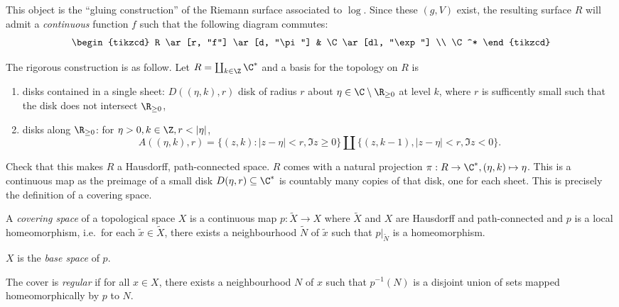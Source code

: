\documentclass[a4paper]{article}
\begin{document}
\begin{eg}
  This object is the ``gluing construction'' of the Riemann surface associated to \(\log\). Since these \((g, V)\) exist, the resulting surface \(R\) will admit a \emph{continuous} function \(f\) such that the following diagram commutes:
  \[
    \begin{tikzcd}
      R \ar[r, "f"] \ar[d, "\pi"] & \C \ar[dl, "\exp"] \\
      \C^*
    \end{tikzcd}
  \]

  The rigorous construction is as follow. Let \(R = \coprod _{k \in \Z} \C^*\) and a basis for the topology on \(R\) is
  \begin{enumerate}
  \item disks contained in a single sheet: \(D((\eta, k), r)\) disk of radius \(r\) about \(\eta \in \C \setminus \R_{\geq 0}\) at level \(k\), where \(r\) is sufficently small such that the disk does not intersect \(\R_{\geq 0}\),
  \item disks along \(\R_{\geq 0}\): for \(\eta > 0, k \in \Z, r < |\eta|\),
    \[
      A((\eta, k), r) = \{(z, k): |z - \eta| < r, \Im z \geq 0\} \amalg \{(z, k - 1), |z - \eta| < r, \Im z < 0\}.
    \]
  \end{enumerate}

Check that this makes \(R\) a Hausdorff, path-connected space. \(R\) comes with a natural projection \(\pi: R \to \C^*, (\eta, k) \mapsto \eta\). This is a continuous map as the preimage of a small disk \(D(\eta, r) \subseteq \C^*\) is countably many copies of that disk, one for each sheet. This is precisely the definition of a covering space.
\end{eg}

\begin{definition}
  A \emph{covering space} of a topological space \(X\) is a continuous map \(p: \tilde X \to X\) where \(\tilde X\) and \(X\) are Hausdorff and path-connected and \(p\) is a local homeomorphism, i.e.\ for each \(\tilde x \in \tilde X\), there exists a neighbourhood \(\tilde N\) of \(\tilde x\) such that \(p|_{\tilde N}\) is a homeomorphism.

    \(X\) is the \emph{base space} of \(p\).

    The cover is \emph{regular} if for all \(x \in X\), there exists a neighbourhood \(N\) of \(x\) such that \(p^{-1}(N)\) is a disjoint union of sets mapped homeomorphically by \(p\) to \(N\).
\end{definition}
\end{document}
